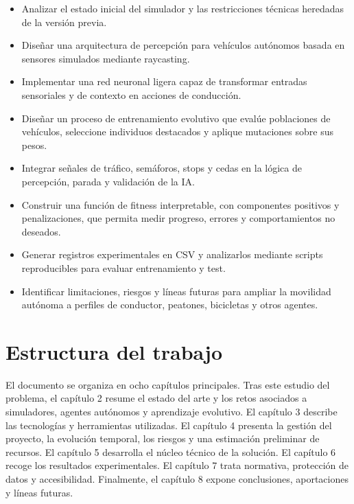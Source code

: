 \begin{itemize}[leftmargin=*]
  \item Analizar el estado inicial del simulador y las restricciones técnicas heredadas de la versión previa.
  \item Diseñar una arquitectura de percepción para vehículos autónomos basada en sensores simulados mediante raycasting.
  \item Implementar una red neuronal ligera capaz de transformar entradas sensoriales y de contexto en acciones de conducción.
  \item Diseñar un proceso de entrenamiento evolutivo que evalúe poblaciones de vehículos, seleccione individuos destacados y aplique mutaciones sobre sus pesos.
  \item Integrar señales de tráfico, semáforos, stops y cedas en la lógica de percepción, parada y validación de la IA.
  \item Construir una función de fitness interpretable, con componentes positivos y penalizaciones, que permita medir progreso, errores y comportamientos no deseados.
  \item Generar registros experimentales en CSV y analizarlos mediante scripts reproducibles para evaluar entrenamiento y test.
  \item Identificar limitaciones, riesgos y líneas futuras para ampliar la movilidad autónoma a perfiles de conductor, peatones, bicicletas y otros agentes.
\end{itemize}

\section{Estructura del trabajo}

El documento se organiza en ocho capítulos principales. Tras este estudio del problema, el capítulo 2 resume el estado del arte y los retos asociados a simuladores, agentes autónomos y aprendizaje evolutivo. El capítulo 3 describe las tecnologías y herramientas utilizadas. El capítulo 4 presenta la gestión del proyecto, la evolución temporal, los riesgos y una estimación preliminar de recursos. El capítulo 5 desarrolla el núcleo técnico de la solución. El capítulo 6 recoge los resultados experimentales. El capítulo 7 trata normativa, protección de datos y accesibilidad. Finalmente, el capítulo 8 expone conclusiones, aportaciones y líneas futuras.
